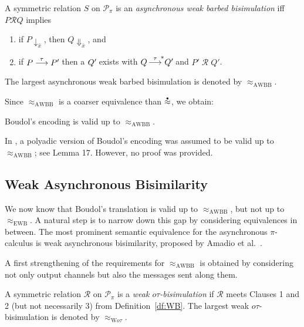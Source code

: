 \documentclass[runningheads]{llncs}
\newcommand{\df}[1]{Definition~\ref{df:#1}}
\newcommand{\T}{\mathcal{P}}             %
\newcommand{\wesim}{\ensuremath{\mathrel{\approx_{\mathrm{EWB}}}}}
\newcommand{\wbb}{\stackrel{\raisebox{-1pt}[0pt][0pt]{$\scriptscriptstyle \bullet$}}{\approx}}
\newcommand{\wbbisim}{\ensuremath{\mathrel{\approx_{\mathrm{AWBB}}}}}
\newcommand{\wotau}{\ensuremath{\mathrel{\approx_{\mathrm{W}o\tau}}}}
\newcommand{\wcomm}{\ocomm}
\newcommand{\scomm}{\sbarb}
\newcommand{\sbarb}[1]{{\downarrow_{#1}}}
\newcommand{\ocomm}[1]{{\Downarrow_{#1}}}
\newcommand{\mrel}{\ensuremath{\mathrel{\mathcal{R}}}}
\newcommand\piCal{$\pi$-calculus}
\begin{document}
\begin{definition}\rm\label{df:awbb}
A symmetric relation $S$ on $\T_\pi$ is an {\em asynchronous weak barbed bisimulation}
iff $P\mrel Q$ implies
\begin{enumerate}
\item if $P \scomm {\bar{x}}$, then $Q \wcomm {\bar{x}}$, and
\item if $P \stackrel{\tau}{\longrightarrow} P'\hspace{-1pt}$ then a $Q'\hspace{-1pt}$ exists with
  $Q \mathop{\stackrel{\tau}{\longrightarrow}^{\!*}}\! Q'\hspace{-1pt}$ and $P'\mathop{\mrel} Q'\!$.%
\end{enumerate}
The largest asynchronous weak barbed bisimulation is denoted by $\wbbisim$.
\end{definition}

\noindent
Since $\wbbisim$ is a coarser equivalence than $\wbb$, we obtain:

\begin{corollary}\rm
Boudol's encoding is valid up to $\wbbisim$.
\end{corollary}
In \cite{QW00}, a polyadic version of Boudol's encoding was assumed to be valid up to $\wbbisim$; see
Lemma 17. However, no proof was provided.

\subsection{Weak Asynchronous Bisimilarity}

\noindent
We now know that Boudol's translation is valid up to $\wbbisim$, but
not up to $\wesim$.
A natural step is to narrow down this gap by considering equivalences in between.
The most prominent semantic equivalence for the asynchronous {\piCal} is
weak asynchronous bisimilarity, proposed by Amadio et al.\ \cite{acs:asynchronous}.

A first strengthening of the requirements for $\wbbisim$ is obtained by considering not only
output channels but also the messages sent along them.

\begin{definition}\rm
A symmetric relation {\mrel} on $\T_\pi$ is a {\em weak $o\tau$-bisimulation}
if {\mrel} meets Clauses 1 and 2 (but not necessarily 3) from \df{WB}.
The largest weak $o\tau$-bisimulation is denoted by $\wotau$.
\end{definition}
\end{document}
